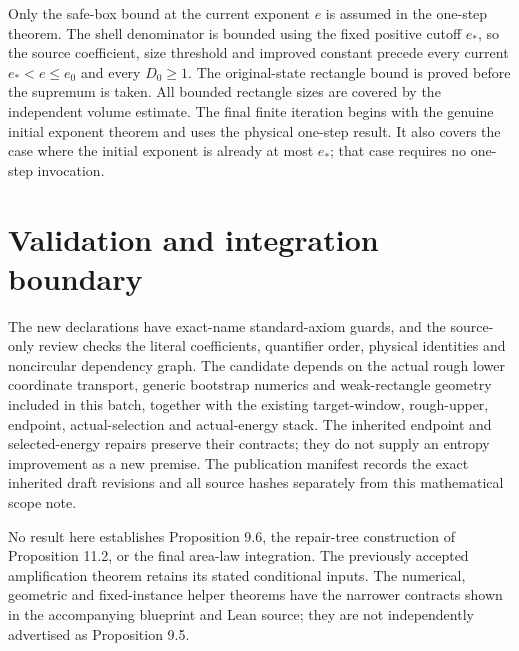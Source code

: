 \documentclass{article}
\begin{document}
Only the safe-box bound at the current exponent $e$ is assumed in the
one-step theorem.  The shell denominator is bounded using the fixed
positive cutoff $e_*$, so the source coefficient, size threshold and
improved constant precede every current $e_*<e\leq e_0$ and every
$D_0\geq1$.
The original-state rectangle bound is proved before the supremum is
taken.  All bounded rectangle sizes are covered by the independent
volume estimate.  The final finite iteration begins with the genuine
initial exponent theorem and uses the physical one-step result.
It also covers the case where the initial exponent is already at most
$e_*$; that case requires no one-step invocation.

\section{Validation and integration boundary}
The new declarations have exact-name standard-axiom guards, and the
source-only review checks the literal coefficients, quantifier order,
physical identities and noncircular dependency graph.
The candidate depends on the actual rough lower coordinate transport,
generic bootstrap numerics and weak-rectangle geometry included in this
batch, together with the existing target-window, rough-upper, endpoint,
actual-selection and actual-energy stack.
The inherited endpoint and selected-energy repairs preserve their
contracts; they do not supply an entropy improvement as a new premise.
The publication manifest records the exact inherited draft revisions and
all source hashes separately from this mathematical scope note.

No result here establishes Proposition 9.6, the repair-tree construction
of Proposition 11.2, or the final area-law integration.
The previously accepted amplification theorem retains its stated
conditional inputs.
The numerical, geometric and fixed-instance helper theorems have the
narrower contracts shown in the accompanying blueprint and Lean source;
they are not independently advertised as Proposition 9.5.
\end{document}
